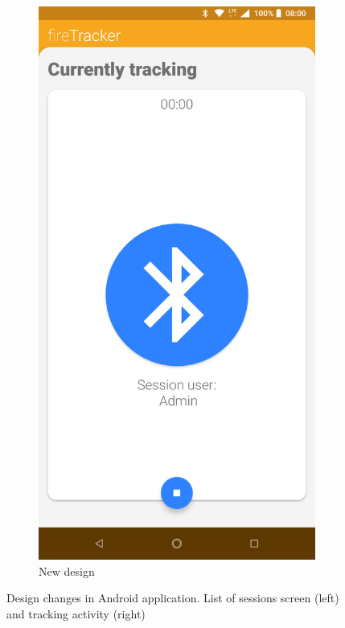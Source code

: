 \documentclass[../Main/thesis.tex]{subfiles}
\begin{document}
\begin{figure}[h]
\begin{subfigure}{0.2\textwidth}
		\includegraphics[width=\textwidth]{../fig/firetracker_app_new_2}
		\caption{New design}
		\label{fig:app-new-design-tracking-iteration3}
	\end{subfigure}
	\caption[Design changes in Android application]{Design changes in Android application. List of sessions screen (left) and tracking activity (right)}
	\label{fig:new-design}
\end{figure}
\end{document}
